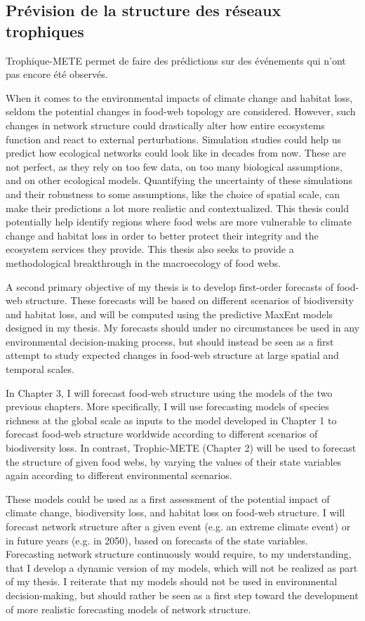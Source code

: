 \subsection{Prévision de la structure des réseaux trophiques} 

Trophique-METE permet de faire des prédictions sur des événements qui n'ont pas
encore été observés.

When it comes to the environmental impacts of climate change and
habitat loss, seldom the potential changes in food-web topology are considered.
However, such changes in network structure could drastically alter how entire
ecosystems function and react to external perturbations. Simulation studies
could help us predict how ecological networks could look like in decades from
now. These are not perfect, as they rely on too few data, on too many biological
assumptions, and on other ecological models. Quantifying the uncertainty of
these simulations and their robustness to some assumptions, like the choice of
spatial scale, can make their predictions a lot more realistic and
contextualized. This thesis could potentially help identify regions where food
webs are more vulnerable to climate change and habitat loss in order to better
protect their integrity and the ecosystem services they provide. This thesis
also seeks to provide a methodological breakthrough in the macroecology of food
webs.

A second primary objective of my thesis is to develop first-order forecasts of
food-web structure. These forecasts will be based on different scenarios of
biodiversity and habitat loss, and will be computed using the predictive MaxEnt
models designed in my thesis. My forecasts should under no circumstances be used
in any environmental decision-making process, but should instead be seen as a
first attempt to study expected changes in food-web structure at large spatial
and temporal scales.

In Chapter 3, I will forecast food-web structure using the models of the two
previous chapters. More specifically, I will use forecasting models of species
richness at the global scale as inputs to the model developed in Chapter 1 to
forecast food-web structure worldwide according to different scenarios of
biodiversity loss. In contrast, Trophic-METE (Chapter 2) will be used to
forecast the structure of given food webs, by varying the values of their state
variables again according to different environmental scenarios.

These models could be used as a first assessment of the potential impact of
climate change, biodiversity loss, and habitat loss on food-web structure. I
will forecast network structure after a given event (e.g. an extreme climate
event) or in future years (e.g. in 2050), based on forecasts of the state
variables. Forecasting network structure continuously would require, to my
understanding, that I develop a dynamic version of my models, which will not be
realized as part of my thesis. I reiterate that my models should not be used in
environmental decision-making, but should rather be seen as a first step toward
the development of more realistic forecasting models of network structure.

